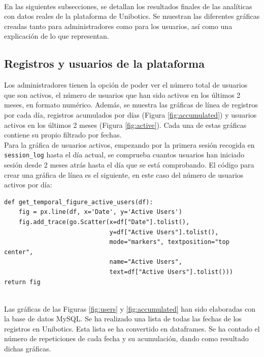 \\
En las siguientes subsecciones, se detallan los resultados finales de las analíticas con datos reales de la plataforma de Unibotics. Se muestran las diferentes gráficas creadas tanto para administradores como para los usuarios, así como una explicación de lo que representan.
\subsection{Registros y usuarios de la plataforma}
Los administradores tienen la opción de poder ver el número total de usuarios que son activos, el número de usuarios que han sido activos en los últimos 2 meses, en formato numérico. Además, se muestra las gráficas de línea de registros por cada día, registros acumulados por días (Figura \ref{fig:accumulated}) y usuarios activos en los últimos 2 meses (Figura \ref{fig:active}). Cada una de estas gráficas contiene su propio filtrado por fechas.\\

Para la gráfica de usuarios activos, empezando por la primera sesión recogida en
\texttt{session\_log} hasta el día actual, se comprueba cuantos usuarios han iniciado sesión desde 2 meses atrás hasta el día que se está comprobando. El código para crear una gráfica de línea es el siguiente, en este caso del número de usuarios activos por día:
\begin{verbatim}
def get_temporal_figure_active_users(df):
    fig = px.line(df, x='Date', y='Active Users')
    fig.add_trace(go.Scatter(x=df["Date"].tolist(), 
                             y=df["Active Users"].tolist(),
                             mode="markers", textposition="top center", 
                             name="Active Users",
                             text=df["Active Users"].tolist()))
return fig
\end{verbatim}
\\
Las gráficas de las Figuras \ref{fig:users} y \ref{fig:accumulated} han sido elaboradas con la base de datos MySQL. Se ha realizado una lista de todas las fechas de los registros en Unibotics. Esta lista se ha convertido en dataframes. Se ha contado el número de repeticiones de cada fecha y su acumulación, dando como resultado dichas gráficas.\\



